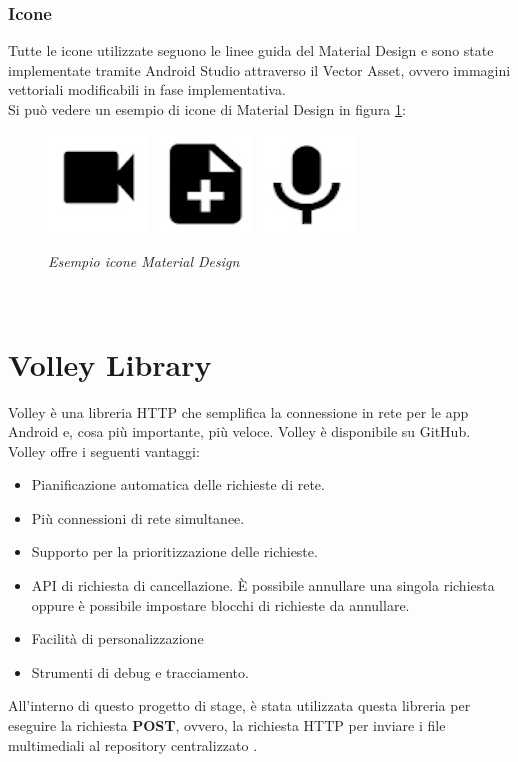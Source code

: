 \subsubsection{Icone}
Tutte le icone utilizzate seguono le linee guida del Material Design e sono state implementate tramite Android Studio attraverso il Vector Asset, ovvero immagini vettoriali modificabili in fase implementativa.\\
Si può vedere un esempio di icone di Material Design in figura \ref{fig:icone}:
\begin{figure}[htp]
\centering
\includegraphics{Tesi/images/Video}\hfill
{\includegraphics{Tesi/images/NotaScritta}}\hfill
\includegraphics{Tesi/images/Microfono}
\caption{\textit{Esempio icone Material Design}}\label{fig:icone}
\end{figure}\\

\section{Volley Library}
\label{volley}
Volley è una libreria HTTP che semplifica la connessione in rete per le app Android e, cosa più importante, più veloce. Volley è disponibile su GitHub.
\\Volley offre i seguenti vantaggi:
\begin{itemize}
    \item Pianificazione automatica delle richieste di rete.
    \item Più connessioni di rete simultanee.
    \item Supporto per la prioritizzazione delle richieste.
    \item API di richiesta di cancellazione. È possibile annullare una singola richiesta oppure è possibile impostare blocchi di richieste da annullare.
    \item Facilità di personalizzazione
    \item Strumenti di debug e tracciamento.
\end{itemize}
All'interno di questo progetto di stage, è stata utilizzata questa libreria per eseguire la richiesta \textbf{POST}, ovvero, la richiesta HTTP per inviare i file multimediali al repository centralizzato \cite{volley}.

